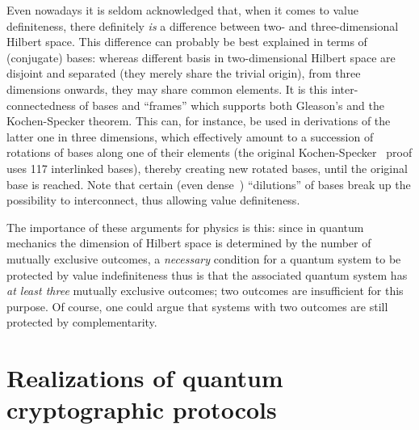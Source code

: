 \documentclass[12pt]{elsarticle}%
\begin{document}
Even nowadays it is seldom acknowledged that,
when it comes to value definiteness, there definitely {\em is} a difference between
two- and three-dimensional Hilbert space.
This difference can probably be best explained in terms of (conjugate) bases:
whereas different basis in two-dimensional Hilbert space are disjoint and separated
(they merely share the trivial origin),
from three dimensions onwards, they may share common elements.
It is this inter-connectedness of bases and ``frames'' which
supports both Gleason's and the Kochen-Specker theorem.
This can, for instance, be used in derivations of the latter one in three dimensions,
which effectively amount to a succession of rotations of bases along one of their elements
(the original Kochen-Specker~\cite{kochen1} proof uses 117 interlinked bases), thereby creating new rotated bases,
until the original base is reached.
Note that certain (even dense~\cite{meyer:99}) ``dilutions'' of bases break up the possibility to interconnect,
thus allowing value definiteness.

The importance of these arguments for physics is this:
since in quantum mechanics the dimension of Hilbert space
is determined by the number of mutually exclusive outcomes,
a {\em necessary} condition for a quantum system to be protected by value indefiniteness
thus is that the associated quantum system has {\em at least three} mutually exclusive outcomes;
two outcomes are insufficient for this purpose.
Of course, one could argue that systems with two outcomes are still protected by complementarity.

\section{Realizations of quantum cryptographic protocols}
\end{document}
